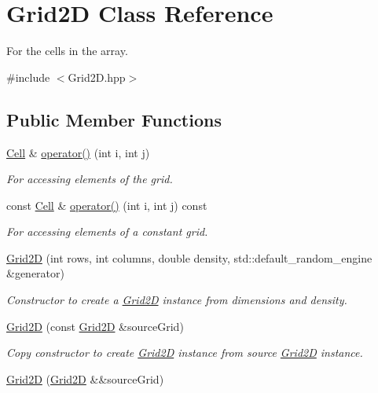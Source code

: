 \hypertarget{class_grid2_d}{}\section{Grid2D Class Reference}
\label{class_grid2_d}


For the cells in the array.  




{\ttfamily \#include $<$Grid2\+D.\+hpp$>$}

\subsection*{Public Member Functions}
\begin{DoxyCompactItemize}
\item 
\hyperlink{class_cell}{Cell} \& \hyperlink{class_grid2_d_a88d8929972ecb8ffcb693bf2ed81aff0}{operator()} (int i, int j)
\begin{DoxyCompactList}\small\item\em For accessing elements of the grid. \end{DoxyCompactList}\item 
const \hyperlink{class_cell}{Cell} \& \hyperlink{class_grid2_d_a48c234358065a78d99724bba59c35075}{operator()} (int i, int j) const
\begin{DoxyCompactList}\small\item\em For accessing elements of a constant grid. \end{DoxyCompactList}\item 
\hyperlink{class_grid2_d_a89370cf1c029125acd439900e2f268b7}{Grid2D} (int rows, int columns, double density, std\+::default\+\_\+random\+\_\+engine \&generator)
\begin{DoxyCompactList}\small\item\em Constructor to create a \hyperlink{class_grid2_d}{Grid2D} instance from dimensions and density. \end{DoxyCompactList}\item 
\hyperlink{class_grid2_d_a44dde66420daa647097e3b5fe86f54ce}{Grid2D} (const \hyperlink{class_grid2_d}{Grid2D} \&source\+Grid)
\begin{DoxyCompactList}\small\item\em Copy constructor to create \hyperlink{class_grid2_d}{Grid2D} instance from source \hyperlink{class_grid2_d}{Grid2D} instance. \end{DoxyCompactList}\item 
\hyperlink{class_grid2_d_a766e9b46b39b3a27d432637037eee951}{Grid2D} (\hyperlink{class_grid2_d}{Grid2D} \&\&source\+Grid)

\end{DoxyCompactItemize}
